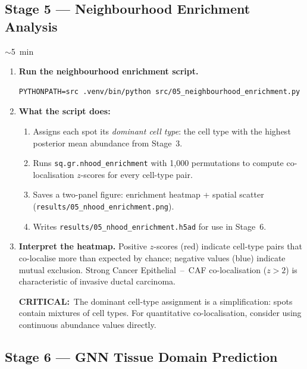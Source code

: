 \documentclass[12pt, a4paper]{article}
\newcommand{\critical}[1]{\par\smallskip\noindent%
    {\color{red!65!black}\bfseries CRITICAL:}\ #1\par\smallskip}
\newcommand{\timing}[1]{%
    \begin{tcolorbox}[colback=orange!7,colframe=orange!55!black,
        fonttitle=\bfseries\small,title=Timing,
        boxrule=0.5pt,left=4pt,right=4pt,top=2pt,bottom=2pt,
        before upper=\small]
    #1
    \end{tcolorbox}\vspace{2pt}}
\begin{document}
\subsection{Stage 5 — Neighbourhood Enrichment Analysis}

\timing{$\sim$5~min}

\begin{enumerate}

\item \textbf{Run the neighbourhood enrichment script.}
\begin{lstlisting}
PYTHONPATH=src .venv/bin/python src/05_neighbourhood_enrichment.py
\end{lstlisting}

\item \textbf{What the script does:}
\begin{enumerate}
    \item Assigns each spot its \emph{dominant cell type}: the cell type
          with the highest posterior mean abundance from Stage~3.
    \item Runs \texttt{sq.gr.nhood\_enrichment} with 1,000 permutations
          to compute co-localisation $z$-scores for every cell-type pair.
    \item Saves a two-panel figure: enrichment heatmap + spatial scatter
          (\texttt{results/05\_nhood\_enrichment.png}).
    \item Writes \texttt{results/05\_nhood\_enrichment.h5ad} for use in
          Stage~6.
\end{enumerate}

\item \textbf{Interpret the heatmap.}
Positive $z$-scores (red) indicate cell-type pairs that co-localise more
than expected by chance; negative values (blue) indicate mutual exclusion.
Strong Cancer Epithelial~--~CAF co-localisation ($z > 2$) is
characteristic of invasive ductal carcinoma.

\critical{The dominant cell-type assignment is a simplification: spots
contain mixtures of cell types.  For quantitative co-localisation,
consider using continuous abundance values directly.}

\end{enumerate}

\subsection{Stage 6 — GNN Tissue Domain Prediction}
\end{document}
